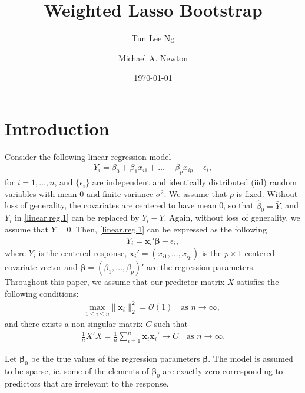 \documentclass[12pt]{article}
\newcommand{\be}{\bm{\beta}} %
\newcommand{\sumin}{\sum_{i=1}^n} %
\newcommand{\dn}{\frac{1}{n}} %
\newcommand{\x}{\bm{x}_i} %
\begin{document}
\title{Weighted Lasso Bootstrap}
\author{
	Tun Lee Ng
	\and
	Michael A. Newton
}\date{\today}
\maketitle

\section{Introduction}

Consider the following linear regression model 
	\begin{align} \label{linear.reg.1}
	Y_i = \beta_0 + \beta_1 x_{i1} + \ldots + \beta_p x_{ip} + \epsilon_i,  
	\end{align}
\noindent for $i = 1, \ldots, n$, and $\{\epsilon_i\}$ are independent and identically distributed (iid) random variables with mean 0 and finite variance $\sigma^2$. We assume that $p$ is fixed. Without loss of generality, the covariates are centered to have mean 0, so that $\hat{\beta}_0 = \bar{Y}$, and $Y_i$ in \eqref{linear.reg.1} can be replaced by $Y_i - \bar{Y}$. Again, without loss of generality, we assume that $\bar{Y} = 0$. Then, \eqref{linear.reg.1} can be expressed as the following         
	\begin{align} \label{linear.reg.2}
	Y_i = \x' \be + \epsilon_i,  
	\end{align}
\noindent where $Y_i$ is the centered response, $\x' = (x_{i1}, \ldots, x_{ip})$ is the $p \times 1$  centered covariate vector and $\be = (\beta_1, \ldots, \beta_p)'$ are the regression parameters. \\

Throughout this paper, we assume that our predictor matrix $X$ satisfies the following conditions:
	\begin{align} \label{cond_max_X_i} 
	\underset{1 \leq i \leq n}{\text{max}} \| \x  \|_2^2 = \mathcal{O} (1) 
	\quad \text{as } n \to \infty,
	\end{align}
and there exists a non-singular matrix $C$ such that
	\begin{align} \label{cond_X'X}
	\dn X'X = \dn \sumin \x \x' \to C 
	\quad \text{as } n \to \infty.
	\end{align}

Let $\be_0$ be the true values of the regression parameters $\be$. The model is assumed to be sparse, ie. some of the elements of $\be_0$ are exactly zero corresponding to predictors that are irrelevant to the response. \\  
\end{document}
